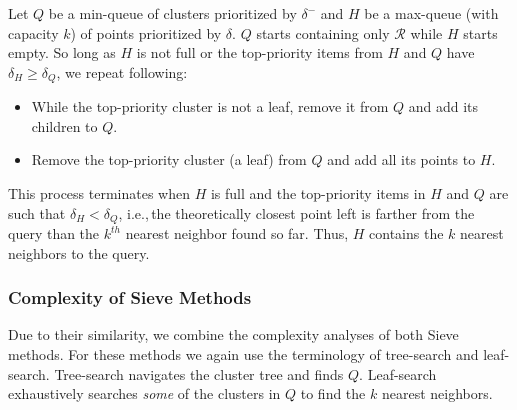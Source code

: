 Let $Q$ be a min-queue of clusters prioritized by $\delta^{-}$ and $H$ be a max-queue (with capacity $k$) of points prioritized by $\delta$.
$Q$ starts containing only $\mathcal{R}$ while $H$ starts empty.
So long as $H$ is not full or the top-priority items from $H$ and $Q$ have $\delta_H \geq \delta_Q$, we repeat following:
\begin{itemize}
    \item While the top-priority cluster is not a leaf, remove it from $Q$ and add its children to $Q$.
    \item Remove the top-priority cluster (a leaf) from $Q$ and add all its points to $H$.
\end{itemize}
This process terminates when $H$ is full and the top-priority items in $H$ and $Q$ are such that $\delta_H < \delta_Q$, i.e.,\,the theoretically closest point left is farther from the query than the $k^{th}$ nearest neighbor found so far.
Thus, $H$ contains the $k$ nearest neighbors to the query.


\subsubsection{Complexity of Sieve Methods}
\label{sec:methods:knn-search:complexity-of-sieve-methods}

Due to their similarity, we combine the complexity analyses of both Sieve methods.
For these methods we again use the terminology of tree-search and leaf-search.
Tree-search navigates the cluster tree and finds $Q$.
Leaf-search exhaustively searches \textit{some} of the clusters in $Q$ to find the $k$ nearest neighbors.


